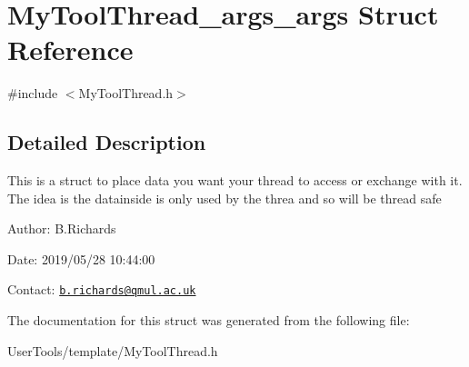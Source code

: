 \hypertarget{structMyToolThread__args__args}{\section{My\-Tool\-Thread\-\_\-args\-\_\-args Struct Reference}
\label{structMyToolThread__args__args}
}


{\ttfamily \#include $<$My\-Tool\-Thread.\-h$>$}



\subsection{Detailed Description}
This is a struct to place data you want your thread to access or exchange with it. The idea is the datainside is only used by the threa and so will be thread safe

\begin{DoxyParagraph}{Author\-:}
B.\-Richards 
\end{DoxyParagraph}
\begin{DoxyParagraph}{Date\-:}
2019/05/28 10\-:44\-:00 
\end{DoxyParagraph}
Contact\-: \href{mailto:b.richards@qmul.ac.uk}{\tt b.\-richards@qmul.\-ac.\-uk} 

The documentation for this struct was generated from the following file\-:\begin{DoxyCompactItemize}
\item 
User\-Tools/template/My\-Tool\-Thread.\-h\end{DoxyCompactItemize}
